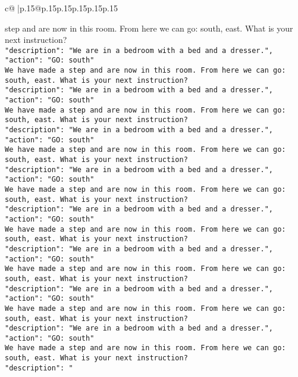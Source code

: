 \documentclass{article}
\begin{document}
{\begin{supertabular}{c@{$\;$}|p{.15\linewidth}@{}p{.15\linewidth}p{.15\linewidth}p{.15\linewidth}p{.15\linewidth}p{.15\linewidth}}
{{{step and are now in this room. From here we can go: south, east. What is your next instruction?\\ \tt {"description": "We are in a bedroom with a bed and a dresser.", "action": "GO: south"}\\ \tt We have made a step and are now in this room. From here we can go: south, east. What is your next instruction?\\ \tt {"description": "We are in a bedroom with a bed and a dresser.", "action": "GO: south"}\\ \tt We have made a step and are now in this room. From here we can go: south, east. What is your next instruction?\\ \tt {"description": "We are in a bedroom with a bed and a dresser.", "action": "GO: south"}\\ \tt We have made a step and are now in this room. From here we can go: south, east. What is your next instruction?\\ \tt {"description": "We are in a bedroom with a bed and a dresser.", "action": "GO: south"}\\ \tt We have made a step and are now in this room. From here we can go: south, east. What is your next instruction?\\ \tt {"description": "We are in a bedroom with a bed and a dresser.", "action": "GO: south"}\\ \tt We have made a step and are now in this room. From here we can go: south, east. What is your next instruction?\\ \tt {"description": "We are in a bedroom with a bed and a dresser.", "action": "GO: south"}\\ \tt We have made a step and are now in this room. From here we can go: south, east. What is your next instruction?\\ \tt {"description": "We are in a bedroom with a bed and a dresser.", "action": "GO: south"}\\ \tt We have made a step and are now in this room. From here we can go: south, east. What is your next instruction?\\ \tt {"description": "We are in a bedroom with a bed and a dresser.", "action": "GO: south"}\\ \tt We have made a step and are now in this room. From here we can go: south, east. What is your next instruction?\\ \tt {"description": " 
	  } 
	   } 
	   } 
	  \\ 
 

    \theutterance {}  

}
\end{supertabular}}
\end{document}
